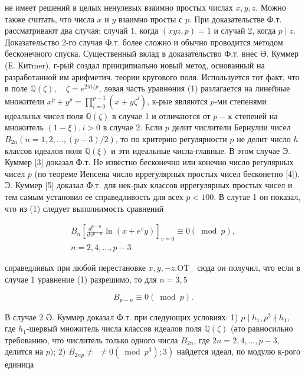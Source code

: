 \documentclass[10pt]{article}
\begin{document}
не имеет решений в целых ненулевых взаимно простых числах $x, y, z$. Можно также считать, что числа $x$ и $y$ взаимно просты с $p$. При доказательстве Ф.т. рассматривают два случая: случай 1, когда $(x y z, p)=1$ и случай 2, когда $p \mid z$. Доказательство 2-го случая Ф.т. более сложно и обычно проводится методом бесконечного спуска. Существенный вклад в доказательство Ф.т. внес Ә. Куммер (Е. Китmer), г-рый создал принципиально новый метод, основанный на разработанной им арифметич. теории кругового поля. Используется тот факт, что в поле $\mathbb{Q}(\zeta), \quad \zeta=e^{2 \pi i / p}$, лөвая часть уравнөния (1) разлагается на линейные множители $x^{p}+y^{p}=\prod_{i=0}^{p-1}\left(x+y \zeta^{i}\right)$, к-рые являются $p$-ми степенями идеальньх чисел поля $\mathbb{Q}(\zeta)$ в случае 1 и отличаются от $p-\mathbf{x}$ степеней на множитель $(1-\xi), i>0$ в случае 2. Если $p$ делит числители Бернулии чисел $B_{2 n}(n=1,2, \ldots,(p-3) / 2)$, то по критерию регулярности $p$ не делит число $h$ классов идеалов поля $\mathbb{Q}(\xi)$ и эти идеальные числа-главные. В этом случае Э. Куммер [3] доказал Ф.т. Не известно бесконечно или конечно число регулярных чисел $p$ (по теореме Иенсена число иррегулярных простых чисел бесконетно [4]). Э. Куммер [5] доказал Ф.т. для нек-рых классов иррегулярных простых чисел и тем самым установил ее справедливость для всех $p<100$. В слутае 1 он показал, что из (1) следует выполнимость сравнений



\[

\begin{gathered}

B_{n}\left[\frac{d^{p-n}}{d v^{p-n}} \ln \left(x+e^{v} y\right)\right]_{v=0} \equiv 0(\bmod p), \\

n=2,4, \ldots, p-3

\end{gathered}

\]



справедливых при любой перестановке $x, y,-z . \mathrm{OT}_{-}$ сюда он получил, что если в случае 1 уравнение (1) разрешимо, то для $n=3,5$



\[

B_{p-n} \equiv 0(\bmod p) .

\]



В случае 2 Ә. Куммер доказал Ф.т. при следующих условиях: 1) $p \mid h_{1}, p^{2} \nmid h_{1}$, где $h_{1}$-шервый множитель числа классов идеалов поля $\mathbb{Q}(\zeta)$ (әто равносильно требованию, что числитель только одного числа $B_{2 n}$, где $2 n=2,4, \ldots, p-3$, делится на $p)$; 2) $B_{2 n p} \neq$ $\left.\neq 0\left(\bmod p^{3}\right) ; 3\right)$ найдется идеал, по модулю к-рого единица
\end{document}
